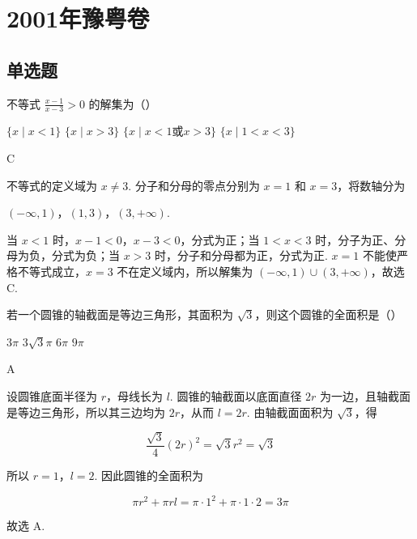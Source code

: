\chapter{2001年豫粤卷}
\section{单选题}
\begin{problem}
不等式 \(\frac{x - 1}{x - 3} > 0\) 的解集为（\quad）

\choices
    {\(\{x \mid x < 1\}\)}
    {\(\{x \mid x > 3\}\)}
    {\(\{x \mid x < 1 \text{或} x > 3\}\)}
    {\(\{x \mid 1 < x < 3\}\)}
\end{problem}

\begin{answer}
C
\end{answer}

\begin{solution}
不等式的定义域为 \(x\ne3\). 分子和分母的零点分别为 \(x=1\) 和 \(x=3\)，将数轴分为

\((-\infty,1)\)，\((1,3)\)，\((3,+\infty)\).

当 \(x<1\) 时，\(x-1<0\)，\(x-3<0\)，分式为正；当 \(1<x<3\) 时，分子为正、分母为负，分式为负；当 \(x>3\) 时，分子和分母都为正，分式为正. \(x=1\) 不能使严格不等式成立，\(x=3\) 不在定义域内，所以解集为 \((-\infty,1)\cup(3,+\infty)\)，故选 C.
\end{solution}

\begin{problem}
若一个圆锥的轴截面是等边三角形，其面积为 \(\sqrt{3}\)，则这个圆锥的全面积是（\quad）

\choices
    {\(3\pi\)}
    {\(3\sqrt{3}\pi\)}
    {\(6\pi\)}
    {\(9\pi\)}
\end{problem}

\begin{answer}
A
\end{answer}

\begin{solution}
设圆锥底面半径为 \(r\)，母线长为 \(l\). 圆锥的轴截面以底面直径 \(2r\) 为一边，且轴截面是等边三角形，所以其三边均为 \(2r\)，从而 \(l=2r\). 由轴截面面积为 \(\sqrt{3}\)，得

\[
\frac{\sqrt{3}}{4}(2r)^2=\sqrt{3}r^2=\sqrt{3}
\]

所以 \(r=1\)，\(l=2\). 因此圆锥的全面积为

\[
\pi r^2+\pi rl=\pi\cdot1^2+\pi\cdot1\cdot2=3\pi
\]

故选 A.
\end{solution}

